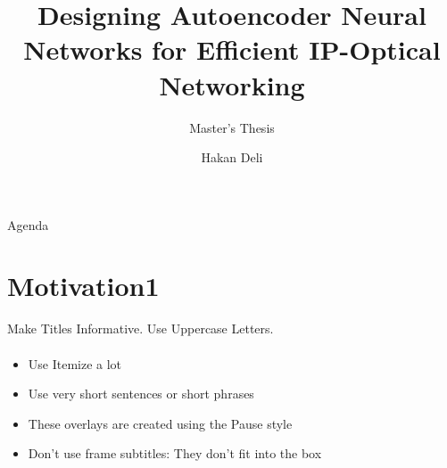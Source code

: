 \documentclass[english,american,german,aspectratio=169]{beamer}
\title{Designing Autoencoder Neural Networks for Efficient IP-Optical Networking}
\subtitle{Master's Thesis}
\author{Hakan Deli}
\begin{document}
\begin{frame}{Agenda}
  \tableofcontents
\end{frame}
\breadcrumbson
\section{Motivation1}
\begin{frame}{Make Titles Informative. Use Uppercase Letters.}

  \framesubtitle{}
  \begin{itemize}
    \item Use Itemize a lot

      \pause{}
    \item Use very short sentences or short phrases

      \pause{}
    \item These overlays are created using the Pause style

      \pause{}
    \item Don't use frame subtitles: They don't fit into the box
  \end{itemize}
\end{frame}
\end{document}
